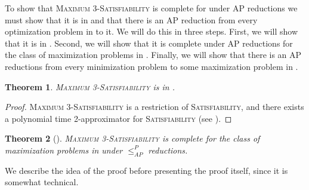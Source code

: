 \documentclass[]{article}
\theoremstyle{plain}
\newtheorem{theorem}{Theorem}
\theoremstyle{definition}
\newcommand{\APr}{\leq_{AP}^{P}}
\begin{document}
To show that \textsc{Maximum 3-Satisfiability} is complete for \APX{} under AP reductions we must show that it is in \APX{} and that there is an AP reduction from every optimization problem in \APX{} to it.
We will do this in three steps.
First, we will show that it is in \APX.
Second, we will show that it is complete under AP reductions for the class of maximization problems in \APX.
Finally, we will show that there is an AP reductions from every minimization problem to some maximization problem in \APX.

\begin{theorem}\label{thm:inapx}
  \textsc{Maximum 3-Satisfiability} is in \APX.
\end{theorem}
\begin{proof}
  \textsc{Maximum 3-Satisfiability} is a restriction of \textsc{Satisfiability}, and there exists a polynomial time 2-approximator for \textsc{Satisfiability} (see \cite[Program~3.1]{book}).
\end{proof}

\begin{theorem}[{\cite[Theorem~8.6]{book}}]\label{thm:maxcomplete}
  \textsc{Maximum 3-Satisfiability} is complete for the class of maximization problems in \APX{} under $\APr$ reductions.
\end{theorem}

We describe the idea of the proof before presenting the proof itself, since it is somewhat technical.
\end{document}
